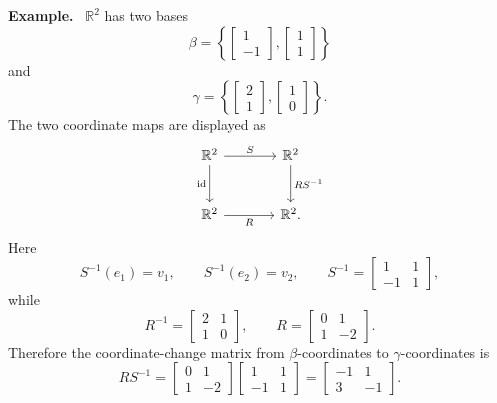 \documentclass[letterpaper]{article}
\newcommand{\noteheader}[1]{\par\medskip\noindent\textbf{#1}\ }
\begin{document}
\noteheader{Example.} $\mathbb{R}^2$ has two bases
\[
\beta=\left\{
\begin{bmatrix}1\\-1\end{bmatrix},
\begin{bmatrix}1\\1\end{bmatrix}
\right\}
\]
and
\[
\gamma=\left\{
\begin{bmatrix}2\\1\end{bmatrix},
\begin{bmatrix}1\\0\end{bmatrix}
\right\}.
\]
The two coordinate maps are displayed as
\[
\begin{tikzcd}[column sep=large,row sep=large]
\mathbb{R}^2 \arrow[r,"S"] \arrow[d,"\mathrm{id}"'] & \mathbb{R}^2 \arrow[d,"RS^{-1}"] \\
\mathbb{R}^2 \arrow[r,"R"'] & \mathbb{R}^2 .
\end{tikzcd}
\]
Here
\[
S^{-1}(e_1)=v_1,
\qquad
S^{-1}(e_2)=v_2,
\qquad
S^{-1}=\begin{bmatrix}1&1\\-1&1\end{bmatrix},
\]
while
\[
R^{-1}=\begin{bmatrix}2&1\\1&0\end{bmatrix},
\qquad
R=\begin{bmatrix}0&1\\1&-2\end{bmatrix}.
\]
Therefore the coordinate-change matrix from $\beta$-coordinates to
$\gamma$-coordinates is
\[
RS^{-1}
=\begin{bmatrix}0&1\\1&-2\end{bmatrix}
\begin{bmatrix}1&1\\-1&1\end{bmatrix}
=\begin{bmatrix}-1&1\\3&-1\end{bmatrix}.
\]
\end{document}
